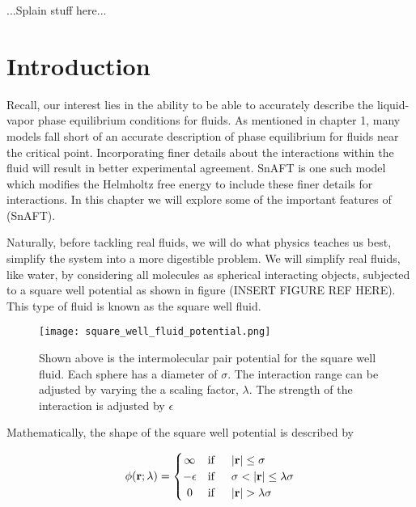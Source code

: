 


...Splain stuff here...


\section{Introduction}

Recall, our interest lies in the ability to be able to accurately describe the liquid-vapor phase equilibrium conditions for fluids.  As mentioned in chapter 1, many models fall short of an accurate description of phase equilibrium for fluids near the critical point.  Incorporating finer details about the interactions within the fluid will result in better experimental agreement.  SnAFT is one such model which modifies the Helmholtz free energy to include these finer details for interactions.  In this chapter we will explore some of the important features of (SnAFT).  

Naturally, before tackling real fluids, we will do what physics teaches us best, simplify the system into a more digestible problem.  We will simplify real fluids, like water, by considering all molecules as spherical interacting objects, subjected to a square well potential as shown in figure (INSERT FIGURE REF HERE).  This type of fluid is known as the square well fluid.  


\begin{figure}[H]
	\centering
	\texttt{[image: square\_well\_fluid\_potential.png]}
	\caption{Shown above is the intermolecular pair potential for the square well fluid.  Each sphere has a diameter of $\sigma$.  The interaction range can be adjusted by varying the a scaling factor, $\lambda$.  The strength of the interaction is adjusted by $\epsilon$}
	\label{fig:p_vs_t_h20}
\end{figure}



Mathematically, the shape of the square well potential is described by

\[
  \phi(\textbf{r};\lambda) = \left\{\def\arraystretch{1.2}%
  \begin{array}{@{}c@{\quad}l@{}}
    \infty & \text{if} \indent |\textbf{r}| \leq \sigma \\
    - \epsilon & \text{if} \indent \sigma < |\textbf{r}| \leq \lambda \sigma \\
    0 & \text{if} \indent |\textbf{r}| > \lambda \sigma \\
    
  \end{array}\right.
\]

